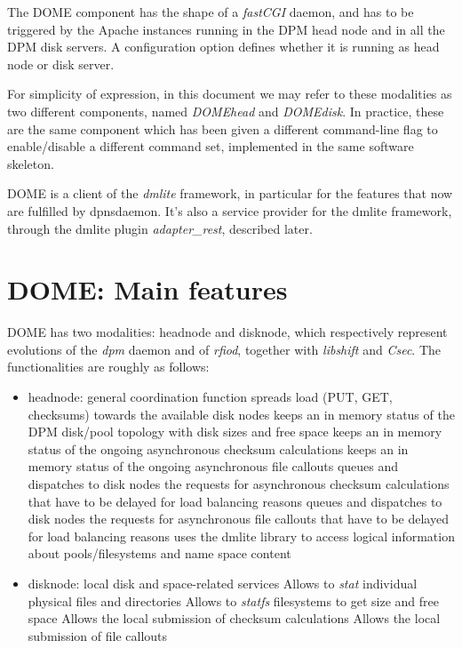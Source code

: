 \documentclass[a4paper,10pt]{scrreprt}
\begin{document}
The DOME component has the shape of a \textit{fastCGI} daemon, and has to be triggered by the Apache instances running in the DPM head node and
in all the DPM disk servers. A configuration option defines whether it is running as head node or disk server.

For simplicity of expression, in this document we may refer to these modalities as two different components, named \textit{DOMEhead} and \textit{DOMEdisk}.
In practice, these are the same component which has been given a different command-line flag to enable/disable a different command set,
implemented in the same software skeleton.

DOME is a client of the \textit{dmlite} framework, in particular for the features that now are fulfilled by dpnsdaemon. It's also a
service provider for the dmlite framework, through the dmlite plugin \textit{adapter\_rest}, described later.

\section{DOME: Main features}
DOME has two modalities: headnode and disknode, which respectively represent evolutions of the \textit{dpm} daemon and of \textit{rfiod}, together with \textit{libshift} and \textit{Csec}.
The functionalities are roughly as follows:
\begin{itemize}
 \item headnode: general coordination function
 \subitem spreads load (PUT, GET, checksums) towards the available disk nodes
 \subitem keeps an in memory status of the DPM disk/pool topology with disk sizes and free space
 \subitem keeps an in memory status of the ongoing asynchronous checksum calculations
 \subitem keeps an in memory status of the ongoing asynchronous file callouts
 \subitem queues and dispatches to disk nodes the requests for asynchronous checksum calculations that have to be delayed for load balancing reasons
 \subitem queues and dispatches to disk nodes the requests for asynchronous file callouts that have to be delayed for load balancing reasons
 \subitem uses the dmlite library to access logical information about pools/filesystems and name space content

 \item disknode: local disk and space-related services
 \subitem Allows to \textit{stat} individual physical files and directories
 \subitem Allows to \textit{statfs} filesystems to get size and free space
 \subitem Allows the local submission of checksum calculations
 \subitem Allows the local submission of file callouts
\end{itemize}
\end{document}
